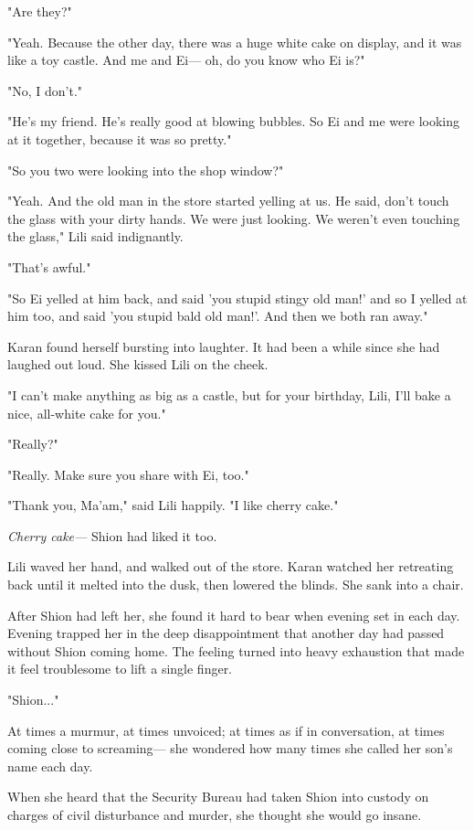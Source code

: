 "Are they?"

"Yeah. Because the other day, there was a huge white cake on display,
and it was like a toy castle. And me and Ei--- oh, do you know who Ei is?"

"No, I don't."

"He's my friend. He's really good at blowing bubbles. So Ei and me were
looking at it together, because it was so pretty."

"So you two were looking into the shop window?"

"Yeah. And the old man in the store started yelling at us. He said,
don't touch the glass with your dirty hands. We were just looking. We
weren't even touching the glass," Lili said indignantly.

"That's awful."

"So Ei yelled at him back, and said 'you stupid stingy old man!' and so
I yelled at him too, and said 'you stupid bald old man!'. And then we
both ran away."

Karan found herself bursting into laughter. It had been a while since
she had laughed out loud. She kissed Lili on the cheek.

"I can't make anything as big as a castle, but for your birthday, Lili,
I'll bake a nice, all-white cake for you."

"Really?"

"Really. Make sure you share with Ei, too."

"Thank you, Ma'am," said Lili happily. "I like cherry cake."

\emph{Cherry cake---} Shion had liked it too.

Lili waved her hand, and walked out of the store. Karan watched her
retreating back until it melted into the dusk, then lowered the blinds.
She sank into a chair.

After Shion had left her, she found it hard to bear when evening set in
each day. Evening trapped her in the deep disappointment that another
day had passed without Shion coming home. The feeling turned into heavy
exhaustion that made it feel troublesome to lift a single finger.

"Shion..."

At times a murmur, at times unvoiced; at times as if in conversation, at
times coming close to screaming--- she wondered how many times she called
her son's name each day.

When she heard that the Security Bureau had taken Shion into custody on
charges of civil disturbance and murder, she thought she would go
insane.

